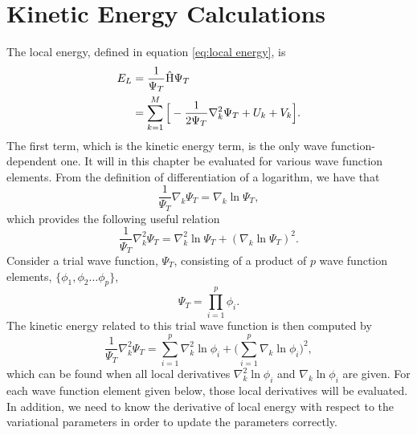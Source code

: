 \section{Kinetic Energy Calculations}
The local energy, defined in equation \eqref{eq:local energy}, is
\begin{align}
E_L &=\frac{1}{\Psi_T}\hat{\text{H}}\Psi_T\\
&=\sum_{k=1}^M\Big[-\frac{1}{2\Psi_T}\nabla_k^2\Psi_T + U_k + V_k\Big].
\end{align}
The first term, which is the kinetic energy term, is the only wave function-dependent one. It will in this chapter be evaluated for various wave function elements. From the definition of differentiation of a logarithm, we have that
\begin{equation}
\frac{1}{\Psi_T}\nabla_k\Psi_T=\nabla_k\ln\Psi_T,
\end{equation}
which provides the following useful relation 
\begin{equation}
\frac{1}{\Psi_T}\nabla_k^2\Psi_T=\nabla_k^2\ln\Psi_T + (\nabla_k\ln\Psi_T)^2.
\end{equation}
Consider a trial wave function, $\Psi_T$, consisting of a product of $p$ wave function elements, $\{\phi_1, \phi_2\hdots\phi_p\}$,
\begin{equation}
\Psi_T = \prod_{i=1}^p\phi_i.
\end{equation}
The kinetic energy related to this trial wave function is then computed by
\begin{equation}
\frac{1}{\Psi_T}\nabla_k^2\Psi_T=\sum_{i=1}^p\nabla_k^2\ln\phi_i + \Big(\sum_{i=1}^p\nabla_k\ln\phi_i\Big)^2,
\end{equation}
which can be found when all local derivatives $\nabla_k^2\ln\phi_i$ and $\nabla_k\ln\phi_i$ are given. For each wave function element given below, those local derivatives will be evaluated. In addition, we need to know the derivative of local energy with respect to the variational parameters in order to update the parameters correctly. 

